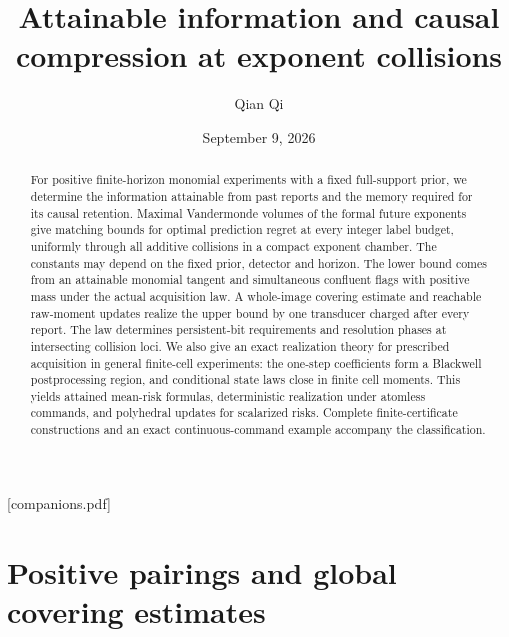 
\providecommand{\upref}[2]{#1~\ref{#2}}
[companions.pdf]
\title[Attainable information at exponent collisions]{Attainable information and causal compression
at exponent collisions}
\author{Qian Qi}
\date{September 9, 2026}

\begin{abstract}
For positive finite-horizon monomial experiments with a fixed full-support
prior, we determine the information attainable from past reports and the
memory required for its causal retention. Maximal Vandermonde volumes of
the formal future
exponents give matching bounds for optimal prediction regret at every
integer label budget, uniformly through all additive collisions in a
compact exponent chamber. The constants may depend on the fixed prior,
detector and horizon. The lower bound comes from an attainable monomial
tangent and simultaneous confluent flags with positive mass under the
actual acquisition law. A whole-image covering estimate and reachable
raw-moment updates realize the upper bound by one transducer charged
after every report. The law determines persistent-bit requirements and
resolution phases at intersecting collision loci. We also give an exact
realization theory for prescribed acquisition in general finite-cell
experiments: the one-step coefficients form a Blackwell postprocessing
region, and conditional state laws close in finite cell moments.
This yields attained mean-risk formulas, deterministic realization
under atomless commands, and polyhedral updates for scalarized risks.
Complete finite-certificate constructions and an exact continuous-command
example accompany the classification.
\end{abstract}
\maketitle






\section{Positive pairings and global covering estimates}
\label{sec:analytic-inputs}


